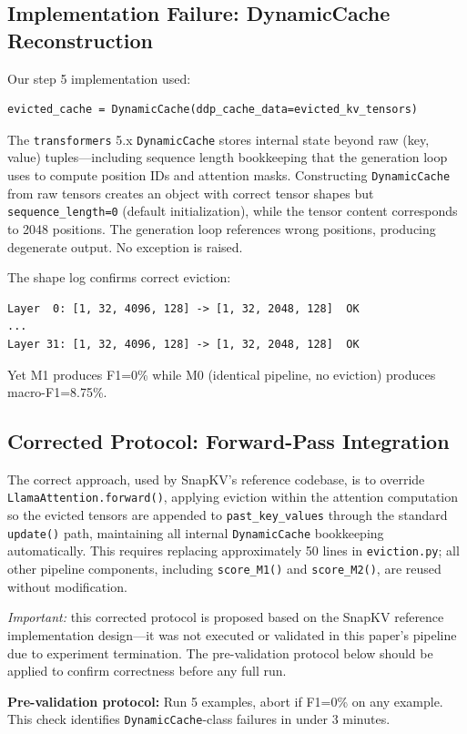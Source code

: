 \subsection{Implementation Failure: DynamicCache Reconstruction}

Our step 5 implementation used:

\begin{verbatim}
evicted_cache = DynamicCache(ddp_cache_data=evicted_kv_tensors)
\end{verbatim}

The \texttt{transformers} 5.x \texttt{DynamicCache} stores internal state beyond raw (key, value) tuples---including sequence length bookkeeping that the generation loop uses to compute position IDs and attention masks. Constructing \texttt{DynamicCache} from raw tensors creates an object with correct tensor shapes but \texttt{sequence\_length=0} (default initialization), while the tensor content corresponds to 2048 positions. The generation loop references wrong positions, producing degenerate output. No exception is raised.

The shape log confirms correct eviction:
\begin{verbatim}
Layer  0: [1, 32, 4096, 128] -> [1, 32, 2048, 128]  OK
...
Layer 31: [1, 32, 4096, 128] -> [1, 32, 2048, 128]  OK
\end{verbatim}

Yet M1 produces F1=0\% while M0 (identical pipeline, no eviction) produces macro-F1=8.75\%.

\subsection{Corrected Protocol: Forward-Pass Integration}

The correct approach, used by SnapKV's reference codebase, is to override \texttt{LlamaAttention.forward()}, applying eviction within the attention computation so the evicted tensors are appended to \texttt{past\_key\_values} through the standard \texttt{update()} path, maintaining all internal \texttt{DynamicCache} bookkeeping automatically. This requires replacing approximately 50 lines in \texttt{eviction.py}; all other pipeline components, including \texttt{score\_M1()} and \texttt{score\_M2()}, are reused without modification.

\emph{Important:} this corrected protocol is proposed based on the SnapKV reference implementation design---it was not executed or validated in this paper's pipeline due to experiment termination. The pre-validation protocol below should be applied to confirm correctness before any full run.

\textbf{Pre-validation protocol:} Run 5 examples, abort if F1=0\% on any example. This check identifies \texttt{DynamicCache}-class failures in under 3 minutes.
